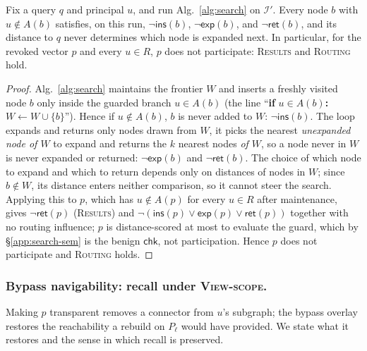 \documentclass[sigconf, nonacm, review]{acmart}
\begin{document}
\begin{lemma}
\label{lem:transparency}
Fix a query $q$ and principal $u$, and run Alg.~\ref{alg:search} on
$\mathcal{I}'$. Every node $b$ with $u\notin A(b)$ satisfies, on this run,
$\lnot\mathsf{ins}(b)$, $\lnot\mathsf{exp}(b)$, and $\lnot\mathsf{ret}(b)$, and
its distance to $q$ never determines which node is expanded next. In
particular, for the revoked vector $p$ and every $u\in R$, $p$ does not
participate: \textsc{Results} and \textsc{Routing} hold.
\end{lemma}
\begin{proof}
Alg.~\ref{alg:search} maintains the frontier $W$ and inserts a freshly visited
node $b$ only inside the guarded branch $u\in A(b)$ (the line
``\textbf{if} $u\in A(b)$\textbf{:} $W\gets W\cup\{b\}$''). Hence if $u\notin
A(b)$, $b$ is never added to $W$: $\lnot\mathsf{ins}(b)$. The loop expands and
returns only nodes drawn from $W$, it picks the nearest \emph{unexpanded
node of $W$} to expand and returns the $k$ nearest nodes \emph{of $W$}, so a
node never in $W$ is never expanded or returned: $\lnot\mathsf{exp}(b)$ and
$\lnot\mathsf{ret}(b)$. The choice of which node to expand and which to return
depends only on distances of nodes in $W$; since $b\notin W$, its distance
enters neither comparison, so it cannot steer the search. Applying this to
$p$, which has $u\notin A(p)$ for every $u\in R$ after maintenance, gives
$\lnot\mathsf{ret}(p)$ (\textsc{Results}) and $\lnot(\mathsf{ins}(p)\lor
\mathsf{exp}(p)\lor\mathsf{ret}(p))$ together with no routing influence; $p$ is
distance-scored at most to evaluate the guard, which by
\S\ref{app:search-sem} is the benign $\mathsf{chk}$, not participation. Hence
$p$ does not participate and \textsc{Routing} holds.
\end{proof}

\subsubsection{Bypass navigability: recall under \textsc{View-scope}.}
\label{app:correct-recall}
Making $p$ transparent removes a connector from $u$'s subgraph; the bypass
overlay restores the reachability a rebuild on $P_\ell$ would have provided.
We state what it restores and the sense in which recall is preserved.
\end{document}

